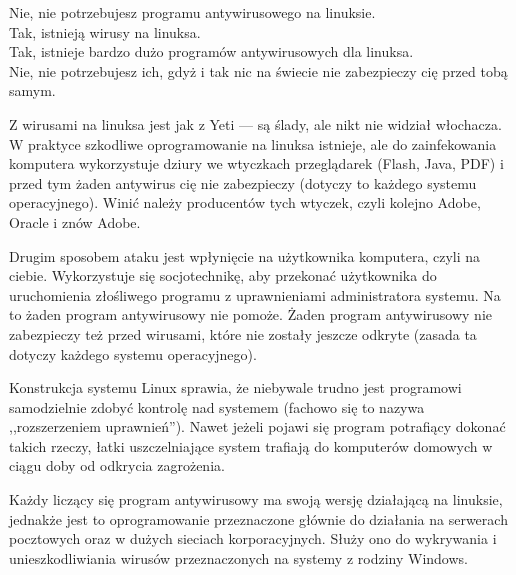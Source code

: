 \noindent \textcolor{ubuntu_orange}{Nie}, nie potrzebujesz programu antywirusowego na linuksie.\\
\textcolor{ubuntu_orange}{Tak}, istnieją wirusy na linuksa.\\
\textcolor{ubuntu_orange}{Tak}, istnieje bardzo dużo programów antywirusowych dla linuksa.\\
\textcolor{ubuntu_orange}{Nie}, nie potrzebujesz ich, gdyż i tak nic na świecie nie zabezpieczy cię przed tobą samym.

Z wirusami na linuksa jest jak z Yeti --- są ślady, ale nikt nie widział włochacza. W praktyce szkodliwe oprogramowanie na linuksa istnieje, ale do zainfekowania komputera wykorzystuje dziury we wtyczkach przeglądarek (Flash, Java, PDF) i przed tym żaden antywirus cię nie zabezpieczy (dotyczy to każdego systemu operacyjnego). Winić należy producentów tych wtyczek, czyli kolejno Adobe, Oracle i znów Adobe.

Drugim sposobem ataku jest wpłynięcie na użytkownika komputera, czyli na ciebie. Wykorzystuje się socjotechnikę, aby przekonać użytkownika do uruchomienia złośliwego programu z uprawnieniami administratora systemu. Na to żaden program antywirusowy nie pomoże. Żaden program antywirusowy nie zabezpieczy też przed wirusami, które nie zostały jeszcze odkryte (zasada ta dotyczy każdego systemu operacyjnego).

Konstrukcja systemu Linux sprawia, że niebywale trudno jest programowi samodzielnie zdobyć kontrolę nad systemem (fachowo się to nazywa ,,rozszerzeniem uprawnień''). Nawet jeżeli pojawi się program potrafiący dokonać takich rzeczy, łatki uszczelniające system trafiają do komputerów domowych w ciągu doby od odkrycia zagrożenia.

Każdy liczący się program antywirusowy ma swoją wersję działającą na linuksie, jednakże jest to oprogramowanie przeznaczone głównie do działania na serwerach pocztowych oraz w dużych sieciach korporacyjnych. Służy ono do wykrywania i unieszkodliwiania wirusów przeznaczonych na systemy z rodziny Windows.


